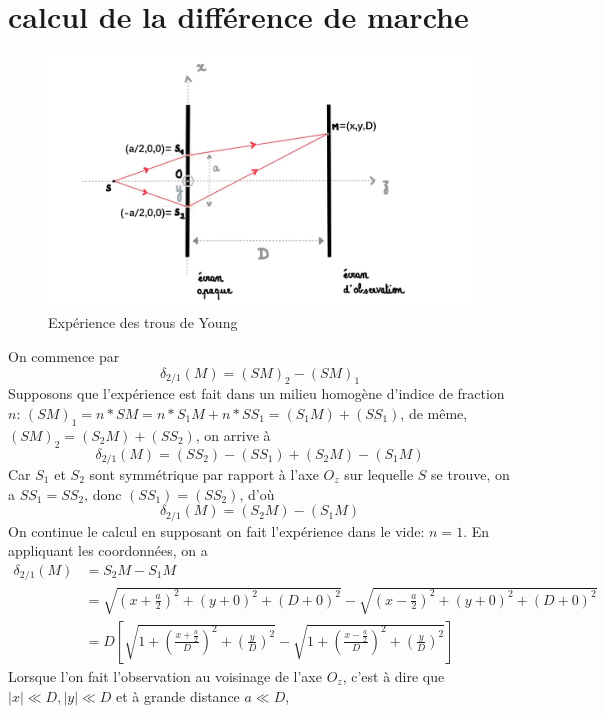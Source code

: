 \documentclass[a4paper,12pt]{book}
\begin{document}
\renewcommand{\labelitemi}{$\blacktriangleright$}
\renewcommand{\labelitemii}{$\bullet$}


\section{calcul de la différence de marche}

\begin{figure}[h]
    \begin{center}
    \includegraphics[scale=0.8]{tr2.png}
    \end{center}
    \caption{Expérience des trous de Young}
\end{figure}
On commence par $$\delta_{2/1}(M)=(SM)_2-(SM)_1$$
Supposons que l'expérience est fait dans un milieu homogène d'indice de fraction $n$: 
$(SM)_1=n*SM=n*S_1M+n*SS_1=(S_1M)+(SS_1)$, de même, $(SM)_2=(S_2M)+(SS_2)$, on arrive à 
$$\delta_{2/1}(M)=(SS_2)-(SS_1) + (S_2M)-(S_1M) $$
Car $S_1$ et $S_2$ sont symmétrique par rapport à l'axe $O_z$ sur lequelle $S$ se trouve, 
on a $SS_1=SS_2$, donc $(SS_1)=(SS_2)$, d'où
$$\delta_{2/1}(M)=(S_2M) - (S_1M)$$
On continue le calcul en supposant on fait l'expérience dans le vide: $n=1$. En appliquant les coordonnées, on a 
\begin{align*}
    \delta_{2/1}(M)&=S_2M - S_1M\\
                   &=\sqrt{\left(x+\frac{a}{2}\right)^2+(y+0)^2+(D+0)^2}-\sqrt{\left(x-\frac{a}{2}\right)^2+(y+0)^2+(D+0)^2}\\
                   &=D\left[\sqrt{1+\left(\frac{x+\frac{a}{2}}{D}\right)^2+(\frac{y}{D})^2}-\sqrt{1+\left(\frac{x-\frac{a}{2}}{D}\right)^2+(\frac{y}{D})^2}\right]
\end{align*} 
Lorsque l'on fait l'observation au voisinage de l'axe $O_z$, c'est à dire que $|x| \ll D, |y| \ll D$ et à grande distance $a \ll D$, 
\end{document}
